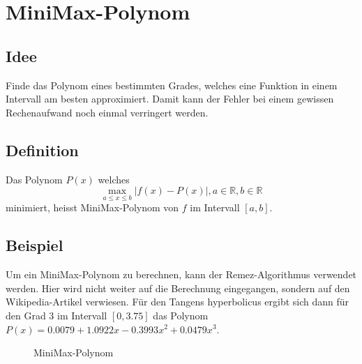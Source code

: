 %
%
%
\section{MiniMax-Polynom 
\label{transfer:section:teil3}}

\subsection{Idee
\label{transfer:subsection:idee}}
Finde das Polynom eines bestimmten Grades, welches eine Funktion
in einem Intervall am besten approximiert. Damit kann der Fehler
bei einem gewissen Rechenaufwand noch einmal verringert werden.

\subsection{Definition
\label{transfer:subsection:definition}}
Das Polynom $P(x)$ welches 
\[
\max _{a \leq x \leq b}|f(x)-P(x)| , a \in \mathbb{R}, b \in \mathbb{R}
\]
minimiert, heisst MiniMax-Polynom von $f$ im Intervall $[a,b]$.
%
\subsection{Beispiel
\label{transfer:subsection:beispiel}}
Um ein MiniMax-Polynom zu berechnen, kann der Remez-Algorithmus
verwendet werden. Hier wird nicht weiter auf die Berechnung
eingegangen, sondern auf den Wikipedia-Artikel \cite{transfer:remez}
verwiesen.
Für den Tangens hyperbolicus ergibt sich dann für den
Grad 3 im Intervall $[0,3.75]$ das Polynom $P(x)=0.0079+1.0922
x-0.3993 x^{2}+0.0479 x^{3}$.


\begin{figure}
	\centering
	\caption{MiniMax-Polynom
		\label{motivation:figure:Minimax3}}
\end{figure}

